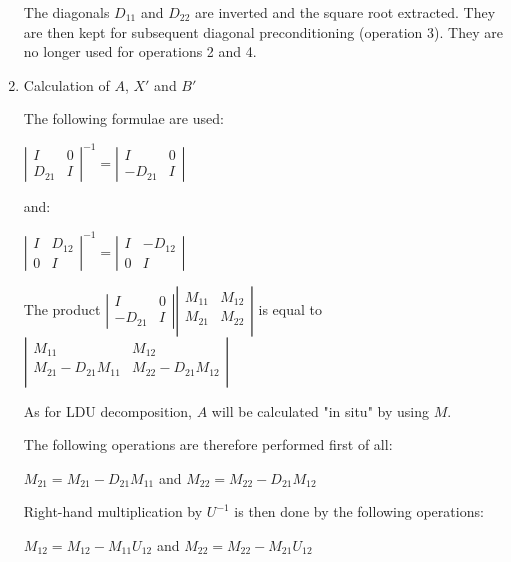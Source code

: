 \begin{enumerate}
The diagonals $D_{11}$ and $D_{22}$ are inverted and the square root extracted.
They are then kept for subsequent diagonal preconditioning (operation 3). They
are no longer used for operations 2 and 4.

\item Calculation of $A$, $X'$ and $B'$

The following formulae are used:

$\left|
\begin{array}{cc}
  I & 0 \\
  D_{21} & I
\end{array}
\right|^{-1}
=
\left|
\begin{array}{cc}
  I & 0 \\
  -D_{21} & I
\end{array}
\right|$

and:

$\left|
\begin{array}{cc}
  I & D_{12} \\
  0 & I
\end{array}
\right|^{-1}
=
\left|
\begin{array}{cc}
  I & -D_{12} \\
  0 & I
\end{array}
\right|$

The product
$\left|
\begin{array}{cc}
  I & 0 \\
  -D_{21} & I
\end{array}
\right|
\left|
\begin{array}{cc}
  M_{11} & M_{12} \\
  M_{21} & M_{22} \\
\end{array}
\right|$
is equal to
$\left|
\begin{array}{cc}
  M_{11} & M_{12} \\
  M_{21} - D_{21}M_{11} & M_{22} - D_{21}M_{12} \\
\end{array}
\right|$

As for LDU decomposition, $A$ will be calculated "in situ" by using $M$.

The following operations are therefore performed first of all:

$M_{21} = M_{21} - D_{21}M_{11}$ and $M_{22} = M_{22} - D_{21}M_{12}$


Right-hand multiplication by $U^{-1}$ is then done by the following operations:

$M_{12} = M_{12} - M_{11}U_{12}$ and $M_{22} = M_{22} - M_{21}U_{12}$


\end{enumerate}
